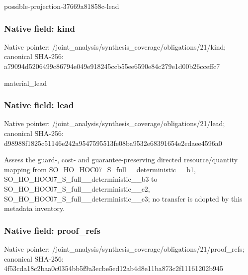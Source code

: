 \documentclass[10pt,a4paper]{article}
\begin{document}
\begingroup\raggedright\sloppy possible-projection-37669a81858c-lead\par\endgroup

\subsubsection{Native field: kind}
Native pointer: /joint\_\allowbreak{}analysis/synthesis\_\allowbreak{}coverage/obligations/21/kind; canonical SHA-256: a79094d5206499c86794e049e918245ccb55ee6590e84c279e1d00b26cceffc7

\begingroup\raggedright\sloppy material\_\allowbreak{}lead\par\endgroup

\subsubsection{Native field: lead}
Native pointer: /joint\_\allowbreak{}analysis/synthesis\_\allowbreak{}coverage/obligations/21/lead; canonical SHA-256: d98988f1825c51146e242a9547595513fe08ba9532e68391654e2edaee4596a0

\begingroup\raggedright\sloppy Assess the guard-,\allowbreak{} cost- and guarantee-preserving directed resource/\allowbreak{}quantity mapping from SO\_\allowbreak{}HO\_\allowbreak{}HOC07\_\allowbreak{}S\_\allowbreak{}full\_\allowbreak{}\_\allowbreak{}deterministic\_\allowbreak{}\_\allowbreak{}b1,\allowbreak{} SO\_\allowbreak{}HO\_\allowbreak{}HOC07\_\allowbreak{}S\_\allowbreak{}full\_\allowbreak{}\_\allowbreak{}deterministic\_\allowbreak{}\_\allowbreak{}b3 to SO\_\allowbreak{}HO\_\allowbreak{}HOC07\_\allowbreak{}S\_\allowbreak{}full\_\allowbreak{}\_\allowbreak{}deterministic\_\allowbreak{}\_\allowbreak{}c2,\allowbreak{} SO\_\allowbreak{}HO\_\allowbreak{}HOC07\_\allowbreak{}S\_\allowbreak{}full\_\allowbreak{}\_\allowbreak{}deterministic\_\allowbreak{}\_\allowbreak{}c3;\allowbreak{} no transfer is adopted by this metadata inventory.\par\endgroup

\subsubsection{Native field: proof\_\allowbreak{}refs}
Native pointer: /joint\_\allowbreak{}analysis/synthesis\_\allowbreak{}coverage/obligations/21/proof\_\allowbreak{}refs; canonical SHA-256: 4f53cda18c2baa0c0354bb5f9a3ecbe5ed12ab4d8e11ba873c2f11161202b945
\end{document}
